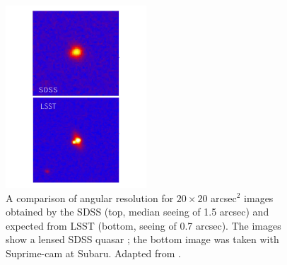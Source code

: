 \begin{figure}
\begin{center}
\includegraphics[width=0.47\textwidth,clip]{panels2}
\end{center}
\caption{A comparison of angular resolution for $20\times20$ arcsec$^2$ images obtained
by the SDSS (top, median seeing of 1.5 arcsec) and expected from LSST (bottom,
seeing of 0.7 arcsec). The images show a lensed SDSS quasar
\citep[SDSS J1332+0347,][]{2007AJ....133..214M}; the bottom image was taken with Suprime-cam at Subaru.
Adapted from \citet{2007AAS...21113707B}.}
\label{Fig:panels2}
\end{figure}
